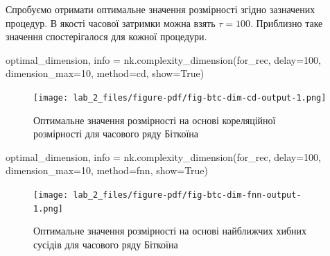 \documentclass[
  letterpaper,
]{report}
\newenvironment{Shaded}{\begin{snugshade}}{\end{snugshade}}
\newcommand{\DecValTok}[1]{\textcolor[rgb]{0.68,0.00,0.00}{#1}}
\newcommand{\NormalTok}[1]{\textcolor[rgb]{0.00,0.23,0.31}{#1}}
\newcommand{\OperatorTok}[1]{\textcolor[rgb]{0.37,0.37,0.37}{#1}}
\newcommand{\StringTok}[1]{\textcolor[rgb]{0.13,0.47,0.30}{#1}}
\newcommand{\VariableTok}[1]{\textcolor[rgb]{0.07,0.07,0.07}{#1}}
\begin{document}
Спробуємо отримати оптимальне значення розмірності згідно зазначених
процедур. В якості часової затримки можна взять \(\tau=100\). Приблизно
таке значення спостерігалося для кожної процедури.

\begin{Shaded}
\begin{Highlighting}[]
\NormalTok{optimal\_dimension, info }\OperatorTok{=}\NormalTok{ nk.complexity\_dimension(for\_rec,}
\NormalTok{                                                  delay}\OperatorTok{=}\DecValTok{100}\NormalTok{,}
\NormalTok{                                                  dimension\_max}\OperatorTok{=}\DecValTok{10}\NormalTok{,}
\NormalTok{                                                  method}\OperatorTok{=}\StringTok{\textquotesingle{}cd\textquotesingle{}}\NormalTok{,}
\NormalTok{                                                  show}\OperatorTok{=}\VariableTok{True}\NormalTok{)}
\end{Highlighting}
\end{Shaded}

\begin{figure}[H]

{\centering \texttt{[image: lab\_2\_files/figure-pdf/fig-btc-dim-cd-output-1.png]}

}

\caption{\label{fig-btc-dim-cd}Оптимальне значення розмірності на основі
кореляційної розмірності для часового ряду Біткоїна}

\end{figure}

\begin{Shaded}
\begin{Highlighting}[]
\NormalTok{optimal\_dimension, info }\OperatorTok{=}\NormalTok{ nk.complexity\_dimension(for\_rec,}
\NormalTok{                                                  delay}\OperatorTok{=}\DecValTok{100}\NormalTok{,}
\NormalTok{                                                  dimension\_max}\OperatorTok{=}\DecValTok{10}\NormalTok{,}
\NormalTok{                                                  method}\OperatorTok{=}\StringTok{\textquotesingle{}fnn\textquotesingle{}}\NormalTok{,}
\NormalTok{                                                  show}\OperatorTok{=}\VariableTok{True}\NormalTok{)}
\end{Highlighting}
\end{Shaded}

\begin{figure}[H]

{\centering \texttt{[image: lab\_2\_files/figure-pdf/fig-btc-dim-fnn-output-1.png]}

}

\caption{\label{fig-btc-dim-fnn}Оптимальне значення розмірності на
основі найближчих хибних сусідів для часового ряду Біткоїна}

\end{figure}
\end{document}
